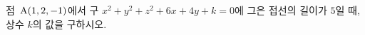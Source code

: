 점~$\mathrm{A}(1{,}\mkern3mu\mathopen{}2{,}\mkern3mu\mathopen{}-1)$에서 구 $x^2+y^2+z^2+6x+4y+k=0$에 그은 접선의 길이가 $5$일 때, 상수 $k$의 값을 구하시오.
